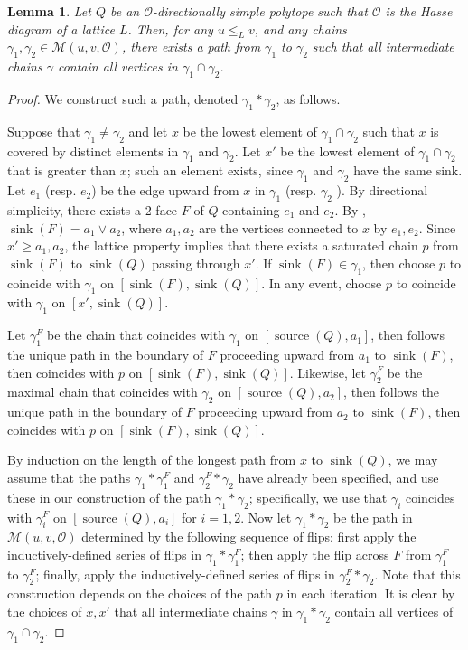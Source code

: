 \documentclass[12pt]{amsart}
\theoremstyle{plain}
\newtheorem{lem}[thm]{Lemma}
\theoremstyle{definition}
\theoremstyle{remark}
\DeclareMathOperator{\sink}{sink}
\DeclareMathOperator{\srce}{source}
\begin{document}
\begin{lem}\label{lem:path-exists}
Let $Q$ be an $\mathcal{O}$-directionally simple polytope such that $\mathcal{O}$ is the Hasse diagram of a lattice $L$. Then, for any $u \leq_L v$, and any chains $\gamma_1,\gamma_2 \in \mathcal{M}(u,v,\mathcal{O})$, there exists a path from $\gamma_1$ to $\gamma_2$ such that all intermediate chains $\gamma$ contain all vertices in $\gamma_1 \cap \gamma_2$. 
\end{lem}
\begin{proof}  
We construct such a path, denoted $\gamma_1 * \gamma_2$, as follows.

Suppose that $\gamma_1 \neq \gamma_2$ and let $x$ be the lowest element of $\gamma_1 \cap \gamma_2$ such that $x$ is covered by distinct  elements in $\gamma_1$ and $\gamma_2$. Let $x'$ be the lowest element of $\gamma_{1} \cap \gamma_{2}$ that is greater than $x$; such an element exists, since $\gamma_{1}$ and $\gamma_{2}$ have the same sink. Let $e_1$ (resp. $e_2$)  be the edge upward from $x$ in $\gamma_1$  (resp. $\gamma_2$ ). By directional simplicity, there exists a 2-face $F$ of $Q$ containing  $e_1$ and $e_2$. By \cite[Thms.~4.6 \& 5.13]{He}, $\sink(F)=a_1 \vee a_2$, where $a_1,a_2$ are the vertices connected to $x$ by $e_1,e_2$. Since $x'\geq a_1, a_2$, the lattice property implies that there exists a saturated chain $p$ from $\sink(F)$ to $\sink(Q)$ passing through $x'$.  If $\sink(F) \in \gamma_1$, then choose $p$ to coincide with $\gamma_1$ on $[\sink(F),\sink(Q)]$. In any event, choose $p$ to coincide with $\gamma_1$ on $[x',\sink(Q)]$.  

Let $\gamma_1^F$ be the chain that coincides with $\gamma_1$  on $[\srce(Q),a_1]$, 
then follows the unique path in  the boundary of $F$ proceeding upward from $a_1$ to $\sink(F)$, then coincides with $p$ on $[\sink(F),\sink(Q)]$.  
Likewise, let $\gamma_2^F$ be the maximal chain that coincides with $\gamma_2$ on $[\srce(Q),a_2]$, then follows the unique  path  in  the boundary of $F$ proceeding upward from  $a_2$  to $\sink(F)$, then coincides with $p$ on $[\sink(F),\sink(Q)]$.   

By induction on the length of the longest path from $x$ to $\sink(Q)$, we may assume that the paths $\gamma_1 * \gamma_1^F$ and $\gamma_2^F * \gamma_2$ have already been specified, and use these in our construction of the path $\gamma_1 * \gamma_2$; specifically, we use that $\gamma_i$ coincides with $\gamma_i^F$ on $[\srce(Q),a_i]$ for $i=1,2$. Now let $\gamma_1 * \gamma_2$ be the path in $\mathcal{M}(u,v,\mathcal{O})$ determined by the following sequence of flips: first apply the inductively-defined series of flips in $\gamma_1 * \gamma_1^F$; then apply the flip across $F$ from $\gamma_1^F$ to $\gamma_2^F$; finally, apply the inductively-defined series of flips in $\gamma_2^F*\gamma_2$. Note that this construction depends on the choices of the path $p$ in each iteration. It is clear by the choices of $x,x'$ that all intermediate chains $\gamma$ in $\gamma_1 * \gamma_2$ contain all vertices of $\gamma_1 \cap \gamma_2$.
\end{proof}
\end{document}
